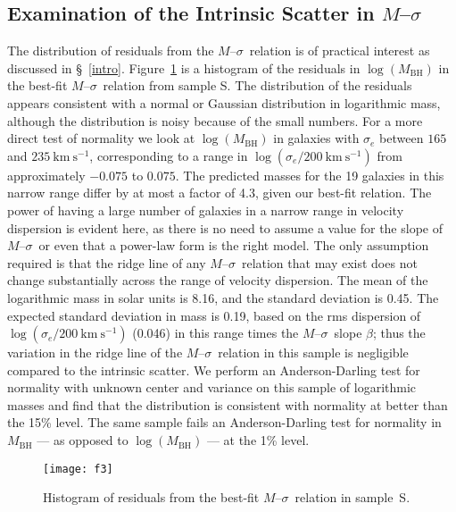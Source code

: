 \documentclass[twosided,letterpaper,numberedappendix]{emulateapj}
\newcommand{\kms}      {\ensuremath{~\mathrm{km~s^{-1}}}}
\newcommand{\msigma}   {\ensuremath{M}{--}\ensuremath{\sigma}}
\newcommand{\mbh}      {\ensuremath{M_{\mathrm{BH}}}}
\begin{document}
\subsection{Examination of the Intrinsic Scatter in 
\texorpdfstring{$M$--$\sigma$}{M-Sigma}}
\label{msigmascatter}

The distribution of residuals from the \msigma\ relation is of
practical interest as discussed in \S~\ref{intro}.
Figure~\ref{f:resids} is a histogram of the residuals in
$\log{(\mbh)}$ in the best-fit \msigma\ relation from sample S.  The
distribution of the residuals appears consistent with a normal or
Gaussian distribution in logarithmic mass, although the distribution
is noisy because of the small numbers.  For a more direct test of
normality we look at $\log(\mbh)$ in galaxies with $\sigma_e$ between
$165$ and $235\kms$, corresponding to a range in
$\log(\sigma_e/200\kms)$ from approximately $-0.075$ to $0.075$.  The
predicted masses for the 19 galaxies in this narrow range differ by at
most a factor of 4.3, given our best-fit relation.  The power of
having a large number of galaxies in a narrow range in velocity
dispersion is evident here, as there is no need to assume a value for
the slope of \msigma\ or even that a power-law form is the right
model.  The only assumption required is that the ridge line of any
\msigma\ relation that may exist does not change substantially across
the range of velocity dispersion.  The mean of the logarithmic mass in
solar units is 8.16, and the standard deviation is 0.45.  The expected
standard deviation in mass is 0.19, based on the rms dispersion of
$\log(\sigma_e/200\kms)$ (0.046) in this range times the \msigma\
slope $\beta$; thus the variation in the ridge line of the \msigma\
relation in this sample is negligible compared to the intrinsic
scatter.  We perform an Anderson-Darling test for normality with
unknown center and variance on this sample of logarithmic masses
\citep{stephens74,numericalrecipes} and find that the distribution is
consistent with normality at better than the 15\% level.  The same
sample fails an Anderson-Darling test for normality in
$M_{\mathrm{BH}}$ --- as opposed to $\log(M_{\mathrm{BH}})$ --- at the
1\% level.

\begin{figure}
\texttt{[image: f3]}
\caption{Histogram of residuals from the best-fit \msigma\ relation in
sample~S.}
\label{f:resids}
\end{figure}
\end{document}
